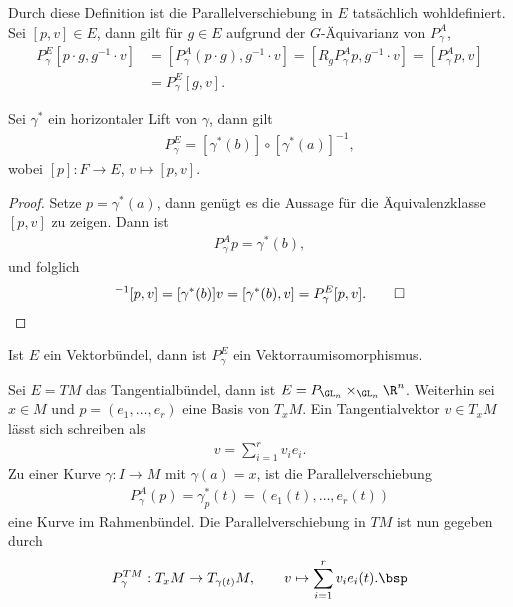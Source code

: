 \documentclass[%
	paper=a5,%
	fleqn,%
	DIV=18,%
	BCOR=0mm,
	fontsize=11pt,
	titlepage=false,%
	bibliography=totoc,
	DIV=18,%
	twoside=true,
	pdftitle=Riemannsche Geometrie,
	pdfauthor=Uwe Semmelmann,
	numbers=noendperiod]%
	{scrbook}
\begin{document}
\begin{rem}[Bemerkungen.]
\begin{remenum}
\item
Durch diese Definition ist die Parallelverschiebung in $E$
tatsächlich wohldefiniert. Sei $[p,v]\in E$, dann gilt für $g\in E$ aufgrund der
$G$-Äquivarianz von $P_\gamma^A$,
\begin{align*}
P_\gamma^E [p\cdot g,g^{-1}\cdot v]
&= \left[P_\gamma^A (p\cdot g),g^{-1}\cdot v \right]
= \left[R_g P_\gamma^A p,g^{-1}\cdot v \right]
= \left[P_\gamma^A p,v \right]\\
&= P_\gamma^E [g,v].
\end{align*}
\item Sei $\gamma^*$ ein horizontaler Lift von $\gamma$, dann gilt
\begin{align*}
P_\gamma^E = [\gamma^*(b)]\circ [\gamma^*(a)]^{-1},
\end{align*}
wobei $[p]:F\to E$, $v\mapsto [p,v]$.
\begin{proof}
Setze $p = \gamma^*(a)$, dann genügt es die Aussage für die Äquivalenzklasse
$[p,v]$ zu zeigen. Dann ist
\begin{align*}
P_\gamma^A p = \gamma^*(b),
\end{align*}
und folglich
\begin{align*}
[\gamma^*(b)][\gamma^*(a)]^{-1}[p,v]
= [\gamma^*(b)]v = 
[\gamma^*(b),v] = P_\gamma^E [p,v].\qed 
\end{align*}
\end{proof}
\item Ist $E$ ein Vektorbündel, dann ist $P_\gamma^E$ ein
Vektorraumisomorphismus.\map
\end{remenum}
\end{rem}

\begin{ex}
Sei $E= TM$ das Tangentialbündel, dann ist $E= P_{\GL_n}\times_{\GL_n} \R^n$.
Weiterhin sei $x\in M$ und $p = (e_1,\ldots,e_r)$ eine Basis von $T_xM$. Ein
Tangentialvektor $v\in T_xM$ lässt sich schreiben als
\begin{align*}
v = \sum_{i=1}^r v_i e_i.
\end{align*} 
Zu einer Kurve $\gamma: I\to M$ mit $\gamma(a) = x$, ist die
Parallelverschiebung
\begin{align*}
P_\gamma^A (p) = \gamma_p^*(t) = (e_1(t),\ldots,e_r(t))
\end{align*}
eine Kurve im Rahmenbündel. Die Parallelverschiebung in $TM$ ist nun gegeben
durch
\begin{align*}
P^{TM}_\gamma : T_xM\to T_{\gamma(t)}M,\qquad v\mapsto \sum_{i=1}^r v_i e_i(t).\bsp
\end{align*}
\end{ex}
\end{document}

